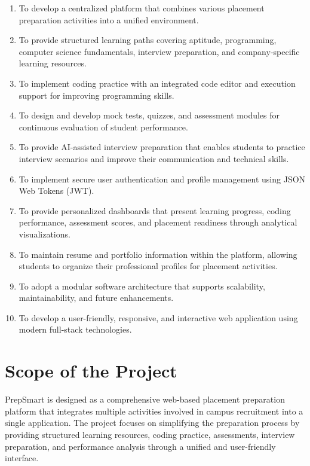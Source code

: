 \begin{enumerate}
    \item To develop a centralized platform that combines various placement preparation activities into a unified environment.

    \item To provide structured learning paths covering aptitude, programming, computer science fundamentals, interview preparation, and company-specific learning resources.

    \item To implement coding practice with an integrated code editor and execution support for improving programming skills.

    \item To design and develop mock tests, quizzes, and assessment modules for continuous evaluation of student performance.

    \item To provide AI-assisted interview preparation that enables students to practice interview scenarios and improve their communication and technical skills.

    \item To implement secure user authentication and profile management using JSON Web Tokens (JWT).

    \item To provide personalized dashboards that present learning progress, coding performance, assessment scores, and placement readiness through analytical visualizations.

    \item To maintain resume and portfolio information within the platform, allowing students to organize their professional profiles for placement activities.

    \item To adopt a modular software architecture that supports scalability, maintainability, and future enhancements.

    \item To develop a user-friendly, responsive, and interactive web application using modern full-stack technologies.
\end{enumerate}

\section{Scope of the Project}

PrepSmart is designed as a comprehensive web-based placement preparation platform that integrates multiple activities involved in campus recruitment into a single application. The project focuses on simplifying the preparation process by providing structured learning resources, coding practice, assessments, interview preparation, and performance analysis through a unified and user-friendly interface.

